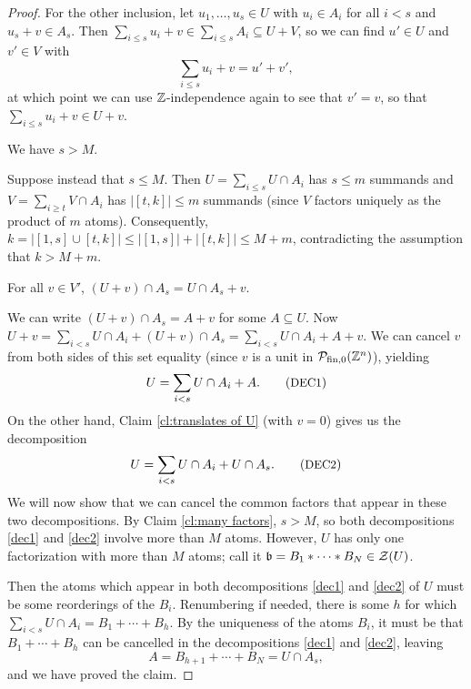 \begin{proof}
	For the other inclusion, let $u_1,\dots, u_s\in U$ with $u_i\in A_i$ for all $i<s$ and $u_s + v\in A_s$.
	Then $\sum_{i\le s} u_i +v \in \sum_{i\le s} A_i \subseteq U+V$, so we can find $u'\in U$ and $v'\in V$ with 
	\[\sum_{i\le s}u_i + v = u' + v',\]
	at which point we can use $\mathbb{Z}$-independence again to see that $v' = v$, so that $\sum_{i\le s} u_i + v\in U+v$.
	
	\begin{claim} \label{cl:many factors}
	We have $s > M$. 
	\end{claim}
	
	
	Suppose instead that $s \le M$.
	Then $U = \sum_{i\le s} U\cap A_i$ has $s\le m$ summands and $V = \sum_{i\ge t} V\cap A_i$ has $|[t,k]| \le m$ summands (since $V$ factors uniquely as the product of $m$ atoms).
	Consequently, $k = |[1,s]\cup[t,k]| \le |[1,s]| + |[t,k]| \le M +m$, contradicting the assumption that $ k > M +m$.
	
	\begin{claim} \label{cl:translated intersection}
	For all $v\in V'$, $(U+v)\cap A_s = U\cap A_s + v$. \label{cld}
	\end{claim}
	
	We can write $(U+v)\cap A_s = A + v$ for some $A \subseteq U$.
	Now $U+v = \sum_{i<s} U\cap A_i + (U+v)\cap A_s = \sum_{i<s} U\cap A_i + A + v$.
	We can cancel $v$ from both sides of this set equality (since $v$ is a unit in $\mathcal{P}_{\textrm{fin}, 0}(\mathbb{Z}^n)$), yielding
	\[ U = \sum_{i<s} U\cap A_i + A. \tag*{({\small DEC1})} \label{dec1}\]
	On the other hand, Claim \ref{cl:translates of U} (with $v = 0$) gives us the decomposition
	\[ U = \sum_{i<s} U\cap A_i + U\cap A_s. \tag*{({\small DEC2})} \label{dec2}\]
	We will now show that we can cancel the common factors that appear in these two decompositions.
	By Claim \ref{cl:many factors}, $s>M$, so both decompositions \ref{dec1} and \ref{dec2} involve more than $M$ atoms.
	However, $U$ has only one factorization with more than $M$ atoms; call it $\mathfrak{b} = B_1*\cdots*B_N\in \mathcal{Z}(U)$.
	
	Then the atoms which appear in both decompositions \ref{dec1} and \ref{dec2} of $U$ must be some reorderings of the $B_i$.
	Renumbering if needed, there is some $h$ for which $\sum_{i<s} U\cap A_i = B_1 + \cdots + B_h$.
	By the uniqueness of the atoms $B_i$, it must be that $B_1 +\cdots + B_h$ can be cancelled in the decompositions \ref{dec1} and \ref{dec2}, leaving
	\[ A = B_{h+1} +\cdots+ B_{N} = U\cap A_s, \]
	and we have proved the claim.
	

\end{proof}
